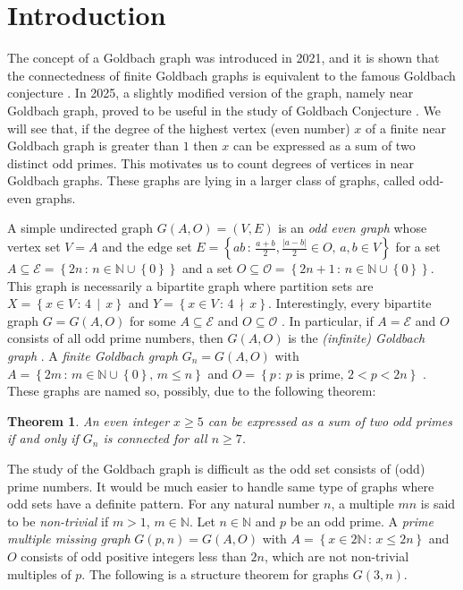 \documentclass[11pt]{article}
\newtheorem{theorem}{Theorem}[section]
\theoremstyle{definition}
\theoremstyle{remark}
\numberwithin{equation}{section}
\newcommand{\Nat}{\mathbb{N}}
\newcommand{\set}[1]{\left\{#1\right\}}
\newcommand{\Set}[2]{\set{#1\, :\, #2}}
\newcommand{\Div}[2]{#1\,\mid\, #2}
\newcommand{\nDiv}[2]{#1\,\nmid\, #2}
\begin{document}


\section{Introduction}

The concept of a Goldbach graph was introduced in 2021, and it is shown that the connectedness of finite Goldbach graphs is equivalent to the famous Goldbach conjecture \cite{DGGS}. In 2025, a slightly modified version of the graph, namely near Goldbach graph, proved to be useful in the study of Goldbach Conjecture \cite{PMMG}. We will see that, if the degree of the highest vertex (even number) $x$ of a finite near Goldbach graph is greater than $1$ then $x$ can be expressed as a sum of two distinct odd primes. This motivates us to count degrees of vertices in near Goldbach graphs. These graphs are lying in a larger class of graphs, called odd-even graphs.

\vspace{1em}
\noindent
A simple undirected graph $G(A,O)=(V,E)$ is an {\em odd even graph} \cite{DGGS} whose vertex set $V=A$ and the edge set $E=\Set{ab}{\frac{a+b}{2}, \frac{|a-b|}{2} \in O,\, a,b\in V}$ for a set $A\subseteq\mathscr{E}=\Set{2n}{n\in\Nat\cup\set{0}}$  and a set $O\subseteq\mathscr{O}=\Set{2n+1}{n\in\Nat\cup\set{0}}$. This graph is necessarily a bipartite graph where partition sets are $X=\Set{x\in V}{\Div{4}{x}}$ and $Y=\Set{x\in V}{\nDiv{4}{x}}$. Interestingly, every bipartite graph $G=G(A,O)$ for some $A\subseteq \mathscr{E}$ and $O\subseteq \mathscr{O}$ \cite{DGGS}. In particular, if $A=\mathscr{E}$ and $O$ consists of all odd prime numbers, then $G(A,O)$ is the {\em (infinite) Goldbach graph} \cite{DGGS}. A {\em finite Goldbach graph} $G_n=G(A,O)$ with $A=\Set{2m}{m\in\Nat\cup\set{0},\, m\leq n}$ and $O=\Set{p}{p\text{ is prime, } 2<p<2n}$ \cite{DGGS}. These graphs are named so, possibly, due to the following theorem:

\begin{theorem}\label{thmgb0} {\em \cite{DGGS}}
An even integer $x\geq 5$ can be expressed as a sum of two odd primes if and only if $G_n$ is connected for all $n\geq 7$.
\end{theorem}

\noindent
The study of the Goldbach graph is difficult as the odd set consists of (odd) prime numbers. It would be much easier to handle same type of graphs where odd sets have a definite pattern. For any natural number $n$, a multiple $mn$ is said to be {\em non-trivial} if $m>1$, $m\in\Nat$. Let $n\in\Nat$ and $p$ be an odd prime. A {\em prime multiple missing graph} \cite{PMMG} $G(p,n)=G(A,O)$ with $A=\Set{x\in 2\Nat}{x\leq 2n}$ and $O$ consists of odd positive integers less than $2n$, which are not non-trivial multiples of $p$. The following is a structure theorem for graphs $G(3,n)$.
\end{document}
